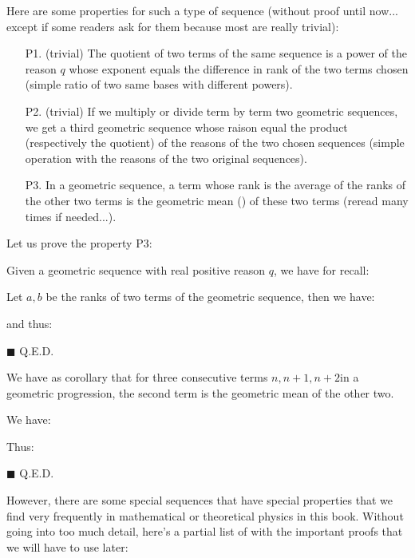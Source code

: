 Here are some properties for such a type of sequence (without proof until now... except if some readers ask for them because most are really trivial):
	\begin{enumerate}
		\item[P1.] (trivial) The quotient of two terms of the same sequence is a power of the reason $q$ whose exponent equals the difference in rank of the two terms chosen (simple ratio of two same bases with different powers).
		\item[P2.] (trivial) If we multiply or divide term by term two geometric sequences, we get a third geometric sequence whose raison equal the product (respectively the quotient) of the reasons of the two chosen sequences (simple operation with the reasons of the two original sequences).
		\item[P3.] In a geometric sequence, a term whose rank is the average of the ranks of the other two terms is the geometric mean () of these two terms (reread many times if needed...).
	\end{enumerate}
Let us prove the property P3:
\begin{dem}
	Given a geometric sequence with real positive reason $q$, we have for recall:
	
Let $a, b$ be the ranks of two terms of the geometric sequence, then we have:
	
and thus:
	
	\begin{flushright}
		$\blacksquare$  Q.E.D.
	\end{flushright}
\end{dem}

	\begin{corollary}
	We have as corollary that for three consecutive terms $n,n+1,n+2$in a geometric progression, the second term is the geometric mean of the other two.
	\end{corollary}
	\begin{dem}
		We have:
		
Thus:	
		
	\begin{flushright}
		$\blacksquare$  Q.E.D.
	\end{flushright}
	\end{dem}
However, there are some special sequences that have special properties that we find very frequently in mathematical or theoretical physics in this book. Without going into  too much detail, here's a partial list of with the important proofs that we will have to use later:

